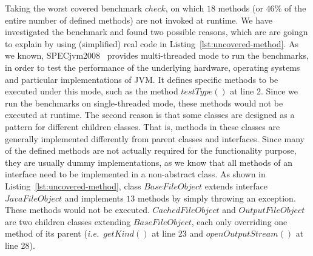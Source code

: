 \documentclass{fac}
\newcommand\ie{\textit{i.e.\ }}
\begin{document}
Taking the worst covered benchmark $check$, on which $18$ methods (or $46\%$ of the entire number of defined methods) are not invoked at runtime. 
We have investigated the benchmark and found two possible reasons, which are are goingn to explain by using (simplified) real code in Listing~\ref{lst:uncovered-method}. 
As we known, SPECjvm2008~\cite{specjvm} provides multi-threaded mode to run the benchmarks, in order to test the performance of the underlying hardware, operating systems and particular implementations of JVM. It defines specific methods to be executed under this mode, such as the method $testType()$ at line 2. Since we run the benchmarks on single-threaded mode, these methods would not be executed at runtime. %
The second reason is that some classes are designed as a pattern for different children classes. That is, methods in these classes are generally implemented differently from parent classes and interfaces. Since many of the defined methods are not actually required for the functionality purpose, they are usually dummy implementations, as we know that all methods of an interface need to be implemented in a non-abstract class.
As shown in Listing~\ref{lst:uncovered-method}, class $BaseFileObject$ extends interface $JavaFileObject$ and implements $13$ methods by simply throwing an exception. These methods would not be executed. $CachedFileObject$ and $OutputFileObject$ are two children classes extending $BaseFileObject$, %
each only overriding one method of its parent (\ie $getKind()$ at line 23 and $openOutputStream()$ at line 28). 
\end{document}
